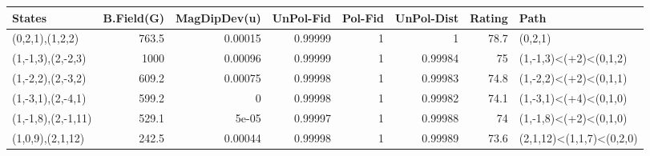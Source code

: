 \begin{tabular}{lrrrrrrl}
\hline
 States             &   B.Field(G) &   MagDipDev(u) &   UnPol-Fid &   Pol-Fid &   UnPol-Dist &   Rating & Path                     \\
\hline
 (0,2,1),(1,2,2)    &        763.5 &        0.00015 &     0.99999 &         1 &      1       &     78.7 & (0,2,1)                  \\
 (1,-1,3),(2,-2,3)  &       1000   &        0.00096 &     0.99999 &         1 &      0.99984 &     75   & (1,-1,3)<(+2)<(0,1,2)    \\
 (1,-2,2),(2,-3,2)  &        609.2 &        0.00075 &     0.99998 &         1 &      0.99983 &     74.8 & (1,-2,2)<(+2)<(0,1,1)    \\
 (1,-3,1),(2,-4,1)  &        599.2 &        0       &     0.99998 &         1 &      0.99982 &     74.1 & (1,-3,1)<(+4)<(0,1,0)    \\
 (1,-1,8),(2,-1,11) &        529.1 &        5e-05   &     0.99997 &         1 &      0.99988 &     74   & (1,-1,8)<(+2)<(0,1,0)    \\
 (1,0,9),(2,1,12)   &        242.5 &        0.00044 &     0.99998 &         1 &      0.99989 &     73.6 & (2,1,12)<(1,1,7)<(0,2,0) \\
\hline
\end{tabular}